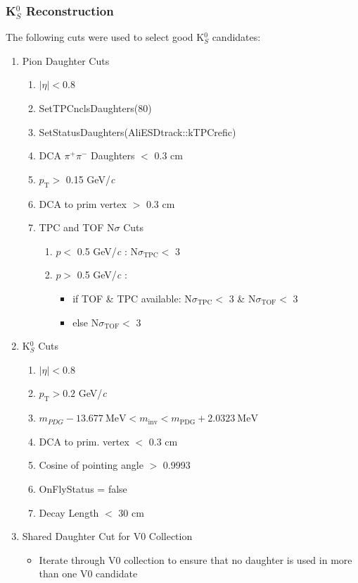 \documentclass[../AnalysisNoteJBuxton.tex]{subfiles}
\begin{document}
\subsubsection{\texorpdfstring{K$^{0}_{S}$}{TEXT} Reconstruction}
\label{K0sReconstruction}

The following cuts were used to select good K$^{0}_{S}$ candidates:

\begin{enumerate}
 \item{Pion Daughter Cuts}
 \begin{enumerate}
  \item $|\eta| < 0.8$
  \item SetTPCnclsDaughters(80)
  \item SetStatusDaughters(AliESDtrack::kTPCrefic)
  \item DCA $\pi^{+}\pi^{-}$ Daughters $<$ 0.3 cm
  \item $p_{\mathrm{T}} >$ 0.15 GeV/\textit{c}
  \item DCA to prim vertex $>$ 0.3 cm
   \item TPC and TOF N$\sigma$ Cuts
   \begin{enumerate}
    \item $p <$ 0.5 GeV/\textit{c} : N$\sigma_{\mathrm{TPC}} <$ 3
    \item $p >$ 0.5 GeV/\textit{c} :
    \begin{itemize}
     \item if TOF \& TPC available: N$\sigma_{\mathrm{TPC}} <$ 3 \& N$\sigma_{\mathrm{TOF}} <$ 3
     \item else N$\sigma_{\mathrm{TOF}} <$ 3
    \end{itemize}
   \end{enumerate}  
 \end{enumerate}

 \item K$^{0}_{S}$ Cuts
 \begin{enumerate}
  \item $|\eta| < 0.8$
  \item $p_{\mathrm{T}} > 0.2$ GeV/\textit{c}
  \item $m_{PDG}-13.677 \ \mathrm{MeV} < m_{\mathrm{inv}} < m_{\mathrm{PDG}} + 2.0323 \ \mathrm{MeV}$
  \item DCA to prim. vertex $<$ 0.3 cm
  \item Cosine of pointing angle $>$ 0.9993
  \item OnFlyStatus = false
  \item Decay Length $<$ 30 cm
 \end{enumerate}  
 \item Shared Daughter Cut for V0 Collection
 \begin{itemize}
  \item Iterate through V0 collection to ensure that no daughter is used in more than one V0 candidate
 \end{itemize} 
\end{enumerate}
\end{document}
